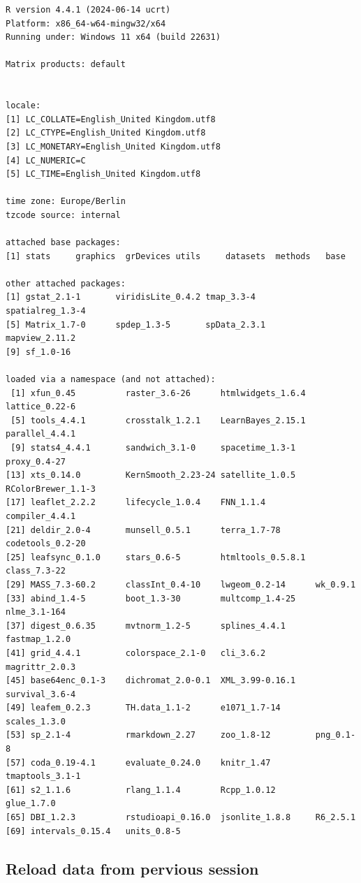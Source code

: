 \documentclass[
  letterpaper,
]{scrbook}
\begin{document}
\begin{verbatim}
R version 4.4.1 (2024-06-14 ucrt)
Platform: x86_64-w64-mingw32/x64
Running under: Windows 11 x64 (build 22631)

Matrix products: default


locale:
[1] LC_COLLATE=English_United Kingdom.utf8 
[2] LC_CTYPE=English_United Kingdom.utf8   
[3] LC_MONETARY=English_United Kingdom.utf8
[4] LC_NUMERIC=C                           
[5] LC_TIME=English_United Kingdom.utf8    

time zone: Europe/Berlin
tzcode source: internal

attached base packages:
[1] stats     graphics  grDevices utils     datasets  methods   base     

other attached packages:
[1] gstat_2.1-1       viridisLite_0.4.2 tmap_3.3-4        spatialreg_1.3-4 
[5] Matrix_1.7-0      spdep_1.3-5       spData_2.3.1      mapview_2.11.2   
[9] sf_1.0-16        

loaded via a namespace (and not attached):
 [1] xfun_0.45          raster_3.6-26      htmlwidgets_1.6.4  lattice_0.22-6    
 [5] tools_4.4.1        crosstalk_1.2.1    LearnBayes_2.15.1  parallel_4.4.1    
 [9] stats4_4.4.1       sandwich_3.1-0     spacetime_1.3-1    proxy_0.4-27      
[13] xts_0.14.0         KernSmooth_2.23-24 satellite_1.0.5    RColorBrewer_1.1-3
[17] leaflet_2.2.2      lifecycle_1.0.4    FNN_1.1.4          compiler_4.4.1    
[21] deldir_2.0-4       munsell_0.5.1      terra_1.7-78       codetools_0.2-20  
[25] leafsync_0.1.0     stars_0.6-5        htmltools_0.5.8.1  class_7.3-22      
[29] MASS_7.3-60.2      classInt_0.4-10    lwgeom_0.2-14      wk_0.9.1          
[33] abind_1.4-5        boot_1.3-30        multcomp_1.4-25    nlme_3.1-164      
[37] digest_0.6.35      mvtnorm_1.2-5      splines_4.4.1      fastmap_1.2.0     
[41] grid_4.4.1         colorspace_2.1-0   cli_3.6.2          magrittr_2.0.3    
[45] base64enc_0.1-3    dichromat_2.0-0.1  XML_3.99-0.16.1    survival_3.6-4    
[49] leafem_0.2.3       TH.data_1.1-2      e1071_1.7-14       scales_1.3.0      
[53] sp_2.1-4           rmarkdown_2.27     zoo_1.8-12         png_0.1-8         
[57] coda_0.19-4.1      evaluate_0.24.0    knitr_1.47         tmaptools_3.1-1   
[61] s2_1.1.6           rlang_1.1.4        Rcpp_1.0.12        glue_1.7.0        
[65] DBI_1.2.3          rstudioapi_0.16.0  jsonlite_1.8.8     R6_2.5.1          
[69] intervals_0.15.4   units_0.8-5       
\end{verbatim}

\hypertarget{reload-data-from-pervious-session-3}{%
\subsection*{Reload data from pervious
session}\label{reload-data-from-pervious-session-3}}
\end{document}
